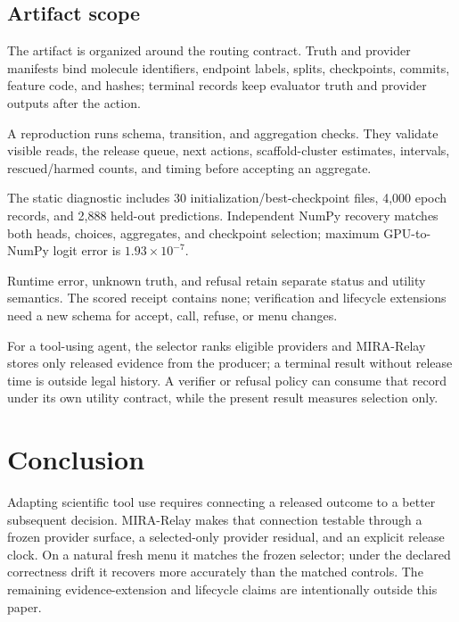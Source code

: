 \documentclass[sigconf,anonymous]{aamas}
\begin{document}
\subsection{Artifact scope}
The artifact is organized around the routing contract. Truth and provider manifests bind molecule identifiers, endpoint labels, splits, checkpoints, commits, feature code, and hashes; terminal records keep evaluator truth and provider outputs after the action.



A reproduction runs schema, transition, and aggregation checks. They validate visible reads, the release queue, next actions, scaffold-cluster estimates, intervals, rescued/harmed counts, and timing before accepting an aggregate.

The static diagnostic includes 30 initialization/best-checkpoint files, 4,000 epoch records, and 2,888 held-out predictions. Independent NumPy recovery matches both heads, choices, aggregates, and checkpoint selection; maximum GPU-to-NumPy logit error is $1.93\times10^{-7}$.

Runtime error, unknown truth, and refusal retain separate status and utility semantics. The scored receipt contains none; verification and lifecycle extensions need a new schema for accept, call, refuse, or menu changes.

For a tool-using agent, the selector ranks eligible providers and MIRA-Relay stores only released evidence from the producer; a terminal result without release time is outside legal history. A verifier or refusal policy can consume that record under its own utility contract, while the present result measures selection only.

\section{Conclusion}
Adapting scientific tool use requires connecting a released outcome to a better subsequent decision. MIRA-Relay makes that connection testable through a frozen provider surface, a selected-only provider residual, and an explicit release clock. On a natural fresh menu it matches the frozen selector; under the declared correctness drift it recovers more accurately than the matched controls. The remaining evidence-extension and lifecycle claims are intentionally outside this paper.

\clearpage
\balance


\end{document}
